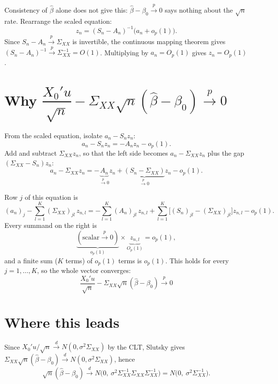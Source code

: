 \documentclass[11pt]{article}
\begin{document}
Consistency of $\hat\beta$ alone does not give this: $\hat\beta-\beta_{0}
\xrightarrow{p}0$ says nothing about the $\sqrt{n}$ rate. Rearrange the scaled
equation:
\[ z_{n} = (S_{n}-A_{n})^{-1}\bigl(a_{n}+o_{p}(1)\bigr). \]
Since $S_{n}-A_{n}\xrightarrow{p}\Sigma_{XX}$ is invertible, the continuous
mapping theorem gives $(S_{n}-A_{n})^{-1}\xrightarrow{p}\Sigma_{XX}^{-1}=O(1)$.
Multiplying by $a_{n}=O_{p}(1)$ gives $z_{n}=O_{p}(1)$.

\section{Why $\dfrac{X_{0}'u}{\sqrt{n}}-\Sigma_{XX}\sqrt{n}(\hat\beta-\beta_{0})
\xrightarrow{p}0$}

From the scaled equation, isolate $a_{n}-S_{n}z_{n}$:
\[ a_{n}-S_{n}z_{n} = -A_{n}z_{n} - o_{p}(1). \]
Add and subtract $\Sigma_{XX}z_{n}$, so that the left side becomes
$a_{n}-\Sigma_{XX}z_{n}$ plus the gap $(\Sigma_{XX}-S_{n})z_{n}$:
\[ a_{n}-\Sigma_{XX}z_{n}
   = -\underbrace{A_{n}}_{\xrightarrow{\ p\ }0}z_{n}
   + \underbrace{(S_{n}-\Sigma_{XX})}_{\xrightarrow{\ p\ }0}z_{n}
   - o_{p}(1). \]

Row $j$ of this equation is
\[ (a_{n})_{j}-\sum_{l=1}^{K}(\Sigma_{XX})_{jl}\,z_{n,l}
   = -\sum_{l=1}^{K}(A_{n})_{jl}\,z_{n,l}
   + \sum_{l=1}^{K}\bigl[(S_{n})_{jl}-(\Sigma_{XX})_{jl}\bigr]z_{n,l}
   - o_{p}(1). \]
Every summand on the right is
\[ \underbrace{(\text{scalar}\xrightarrow{p}0)}_{o_{p}(1)}
   \times \underbrace{z_{n,l}}_{O_{p}(1)} = o_{p}(1), \]
and a finite sum ($K$ terms) of $o_{p}(1)$ terms is $o_{p}(1)$. This holds for
every $j=1,\dots,K$, so the whole vector converges:
\[ \boxed{\ \frac{X_{0}'u}{\sqrt{n}}
   - \Sigma_{XX}\sqrt{n}(\hat\beta-\beta_{0})
   \xrightarrow{\ p\ } 0\ } \]

\section{Where this leads}

Since $X_{0}'u/\sqrt{n}\xrightarrow{d}N(0,\sigma^{2}\Sigma_{XX})$ by the CLT,
Slutsky gives $\Sigma_{XX}\sqrt{n}(\hat\beta-\beta_{0})
\xrightarrow{d}N(0,\sigma^{2}\Sigma_{XX})$, hence
\[ \sqrt{n}(\hat\beta-\beta_{0})
   \xrightarrow{\ d\ } N\bigl(0,\ \sigma^{2}\Sigma_{XX}^{-1}
   \Sigma_{XX}\Sigma_{XX}^{-1}\bigr)
   = N\bigl(0,\ \sigma^{2}\Sigma_{XX}^{-1}\bigr). \]
\end{document}
